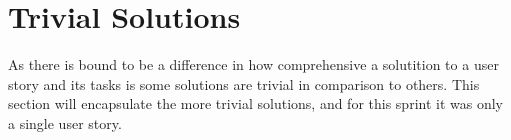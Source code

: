 \section{Trivial Solutions}
As there is bound to be a difference in how comprehensive a solutition to a user story and its tasks is some solutions are trivial in comparison to others.
This section will encapsulate the more trivial solutions, and for this sprint it was only a single user story.

